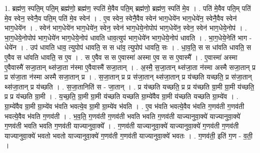 \documentclass[17pt]{extarticle}
\begin{document}
1. ब्रह्म॑ण॒ स्पति॒म् पति॒म् ब्रह्म॑णो॒ ब्रह्म॑ण॒ स्पति॑ मे॒वैव पति॒म् ब्रह्म॑णो॒ ब्रह्म॑ण॒ स्पति॑ मे॒व । . पति॑ मे॒वैव पति॒म् पति॑ मे॒व स्वेन॒ स्वेनै॒व पति॒म् पति॑ मे॒व स्वेन॑ । . ए॒व स्वेन॒ स्वेनै॒वैव स्वेन॑ भाग॒धेये॑न भाग॒धेये॑न॒ स्वेनै॒वैव स्वेन॑ भाग॒धेये॑न । . स्वेन॑ भाग॒धेये॑न भाग॒धेये॑न॒ स्वेन॒ स्वेन॑ भाग॒धेये॒नोपोप॑ भाग॒धेये॑न॒ स्वेन॒ स्वेन॑ भाग॒धेये॒नोप॑ । . भा॒ग॒धेये॒नोपोप॑ भाग॒धेये॑न भाग॒धेये॒नोप॑ धावति धाव॒त्युप॑ भाग॒धेये॑न भाग॒धेये॒नोप॑ धावति । . भा॒ग॒धेये॒नेति॑ भाग - धेये॑न । . उप॑ धावति धाव॒ त्युपोप॑ धावति॒ स स धा॑व॒ त्युपोप॑ धावति॒ सः । . धा॒व॒ति॒ स स धा॑वति धावति॒ स ए॒वैव स धा॑वति धावति॒ स ए॒व । . स ए॒वैव स स ए॒वास्मा॑ अस्मा ए॒व स स ए॒वास्मै᳚ । . ए॒वास्मा॑ अस्मा ए॒वैवास्मै॑ सजा॒तान् थ्स॑जा॒ता न॑स्मा ए॒वैवास्मै॑ सजा॒तान् । . अ॒स्मै॒ स॒जा॒तान् थ्स॑जा॒ता न॑स्मा अस्मै सजा॒तान् प्र प्र स॑जा॒ता न॑स्मा अस्मै सजा॒तान् प्र । . स॒जा॒तान् प्र प्र स॑जा॒तान् थ्स॑जा॒तान् प्र य॑च्छति यच्छति॒ प्र स॑जा॒तान् थ्स॑जा॒तान् प्र य॑च्छति । . स॒जा॒तानिति॑ स - जा॒तान् । . प्र य॑च्छति यच्छति॒ प्र प्र य॑च्छति ग्रा॒मी ग्रा॒मी य॑च्छति॒ प्र प्र य॑च्छति ग्रा॒मी । . य॒च्छ॒ति॒ ग्रा॒मी ग्रा॒मी य॑च्छति यच्छति ग्रा॒म्ये॑वैव ग्रा॒मी य॑च्छति यच्छति ग्रा॒म्ये॑व । . ग्रा॒म्ये॑वैव ग्रा॒मी ग्रा॒म्ये॑व भ॑वति भवत्ये॒व ग्रा॒मी ग्रा॒म्ये॑व भ॑वति । . ए॒व भ॑वति भवत्ये॒वैव भ॑वति ग॒णव॑ती ग॒णव॑ती भवत्ये॒वैव भ॑वति ग॒णव॑ती । . भ॒व॒ति॒ ग॒णव॑ती ग॒णव॑ती भवति भवति ग॒णव॑ती याज्यानुवा॒क्ये॑ याज्यानुवा॒क्ये॑ ग॒णव॑ती भवति भवति ग॒णव॑ती याज्यानुवा॒क्ये᳚ । . ग॒णव॑ती याज्यानुवा॒क्ये॑ याज्यानुवा॒क्ये॑ ग॒णव॑ती ग॒णव॑ती याज्यानुवा॒क्ये॑ भवतो भवतो याज्यानुवा॒क्ये॑ ग॒णव॑ती ग॒णव॑ती याज्यानुवा॒क्ये॑ भवतः । . ग॒णव॑ती॒ इति॑ ग॒ण - व॒ती॒ । \newline
\end{document}
